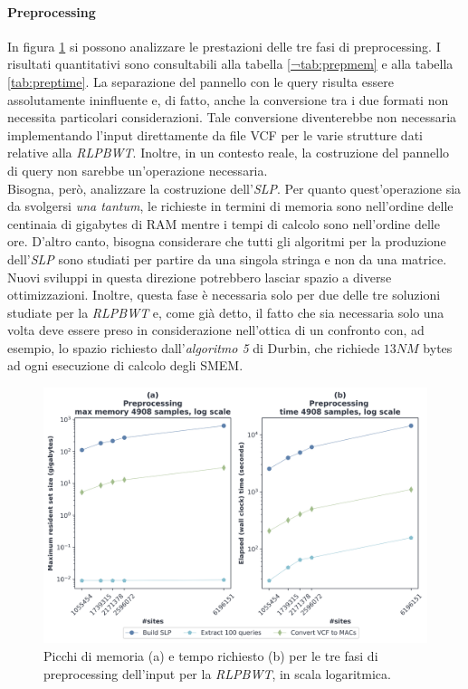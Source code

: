 \paragraph{Preprocessing}
In figura \ref{fig:prechr} si possono analizzare le prestazioni delle tre
fasi di preprocessing. I risultati quantitativi sono consultabili alla tabella
\ref{¬tab:prepmem} e alla tabella \ref{tab:preptime}. La separazione del
pannello con le query risulta essere assolutamente 
ininfluente e, di fatto, anche la conversione tra i due formati non
necessita particolari considerazioni. Tale conversione 
diventerebbe non necessaria implementando l'input direttamente da file VCF per
le varie strutture dati relative alla \textit{RLPBWT}. Inoltre, in un contesto
reale, la costruzione del pannello di query non sarebbe un'operazione
necessaria.\\
Bisogna, però, analizzare la costruzione 
dell'\textit{SLP}. Per quanto quest'operazione sia da svolgersi \textit{una
  tantum}, le richieste in termini di memoria sono nell'ordine delle centinaia
di gigabytes di RAM mentre i tempi di calcolo sono nell'ordine delle
ore. D'altro canto, bisogna considerare che tutti gli algoritmi per la produzione
dell'\textit{SLP} sono studiati per partire da una singola stringa e non da una
matrice. Nuovi sviluppi in questa direzione potrebbero lasciar spazio a diverse
ottimizzazioni. Inoltre,
questa fase è necessaria solo per due delle tre soluzioni studiate per la
\textit{RLPBWT} e, come già detto, il fatto che sia necessaria solo una volta
deve essere preso in considerazione nell'ottica di un confronto con, ad esempio,
lo spazio richiesto dall'\textit{algoritmo 5} di Durbin, che richiede $13NM$
bytes ad ogni esecuzione di calcolo degli SMEM.
\begin{figure}
  \centering
  \includegraphics[width=\linewidth]{img/prep_mem_time.png}
  \caption{Picchi di memoria (a) e tempo richiesto (b) per le tre fasi di
    preprocessing dell'input per la \textit{RLPBWT}, in scala logaritmica.}
  \label{fig:prechr}
\end{figure}

